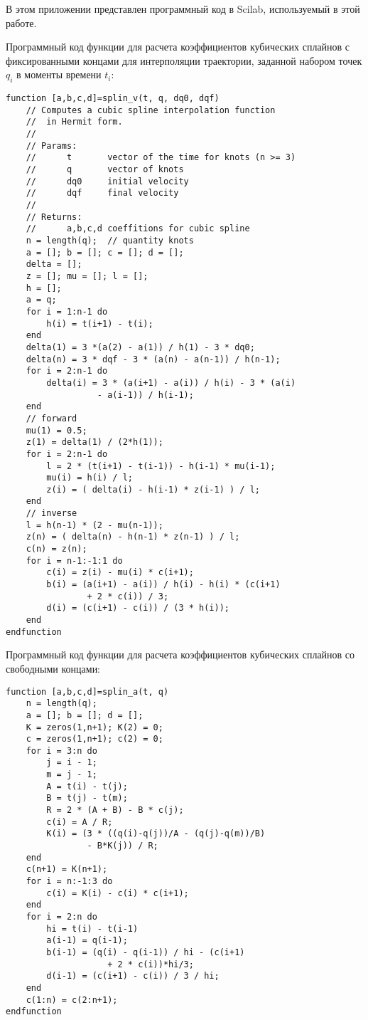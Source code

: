 \label{append_app_example}

В этом приложении представлен программный код в Scilab, используемый в этой работе.

Программный код функции для расчета коэффициентов кубических сплайнов с фиксированными концами для интерполяции траектории, заданной набором точек $ q_i $ в моменты времени $ t_i $:

\begin{lstlisting}
function [a,b,c,d]=splin_v(t, q, dq0, dqf)
	// Computes a cubic spline interpolation function 
	//  in Hermit form.
	//
	// Params:
	//      t       vector of the time for knots (n >= 3)
	//      q       vector of knots
	//      dq0     initial velocity
	//      dqf     final velocity
	//
	// Returns:
	//      a,b,c,d coeffitions for cubic spline
	n = length(q);  // quantity knots
	a = []; b = []; c = []; d = [];
	delta = [];
	z = []; mu = []; l = [];
	h = [];
	a = q;
	for i = 1:n-1 do
		h(i) = t(i+1) - t(i);
	end
	delta(1) = 3 *(a(2) - a(1)) / h(1) - 3 * dq0;
	delta(n) = 3 * dqf - 3 * (a(n) - a(n-1)) / h(n-1);
	for i = 2:n-1 do
		delta(i) = 3 * (a(i+1) - a(i)) / h(i) - 3 * (a(i) 
		          - a(i-1)) / h(i-1);
	end
	// forward
	mu(1) = 0.5;
	z(1) = delta(1) / (2*h(1)); 
	for i = 2:n-1 do   
		l = 2 * (t(i+1) - t(i-1)) - h(i-1) * mu(i-1);
		mu(i) = h(i) / l;
		z(i) = ( delta(i) - h(i-1) * z(i-1) ) / l;
	end
	// inverse
	l = h(n-1) * (2 - mu(n-1));
	z(n) = ( delta(n) - h(n-1) * z(n-1) ) / l;
	c(n) = z(n);   
	for i = n-1:-1:1 do 
		c(i) = z(i) - mu(i) * c(i+1);
		b(i) = (a(i+1) - a(i)) / h(i) - h(i) * (c(i+1) 
				+ 2 * c(i)) / 3;
		d(i) = (c(i+1) - c(i)) / (3 * h(i));
	end
endfunction
\end{lstlisting}

Программный код функции для расчета коэффициентов кубических сплайнов со свободными концами:

\begin{lstlisting}
function [a,b,c,d]=splin_a(t, q)
	n = length(q);
	a = []; b = []; d = [];
	K = zeros(1,n+1); K(2) = 0;
	c = zeros(1,n+1); c(2) = 0; 
	for i = 3:n do
		j = i - 1;
		m = j - 1;
		A = t(i) - t(j);
		B = t(j) - t(m);
		R = 2 * (A + B) - B * c(j);
		c(i) = A / R;
		K(i) = (3 * ((q(i)-q(j))/A - (q(j)-q(m))/B) 
				- B*K(j)) / R;
	end
	c(n+1) = K(n+1);
	for i = n:-1:3 do
		c(i) = K(i) - c(i) * c(i+1);
	end
	for i = 2:n do
		hi = t(i) - t(i-1)
		a(i-1) = q(i-1);
		b(i-1) = (q(i) - q(i-1)) / hi - (c(i+1) 
					+ 2 * c(i))*hi/3;
		d(i-1) = (c(i+1) - c(i)) / 3 / hi;
	end
	c(1:n) = c(2:n+1); 
endfunction
\end{lstlisting}

